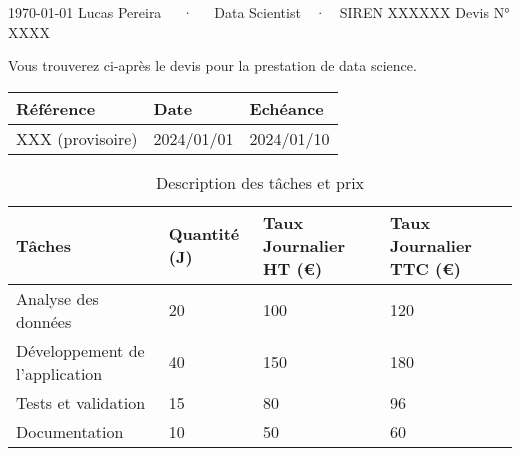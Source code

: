 \documentclass[11pt, a4paper]{awesome-cv}
\begin{document}
\makecvheader[R]

\makecvfooter
  {\today}
  {Lucas Pereira~~~·~~~Data Scientist~~·~~SIREN XXXXXX}
  {Devis N° XXXX}

\makelettertitle

\begin{cvletter}

Vous trouverez ci-après le devis pour la prestation de data science.

\vspace{1cm} %

\renewcommand{\arraystretch}{1.5}
\newcommand{\tablefont}{\fontsize{10pt}{13pt}\selectfont}

\begin{table}[h!]
    \centering
    \tablefont
    \color{tabletext}
    \begin{tabular}{C{5cm} C{5cm} C{5cm}}
        \rule{0pt}{2.5ex} \textbf{Référence} & \textbf{Date} & \textbf{Echéance} \\
        \hline
        \rule{0pt}{2.5ex} XXX (provisoire) & 2024/01/01 & 2024/01/10
    \end{tabular}
\end{table}

\begin{table}[h!]
    \centering
    \tablefont
    \caption{Description des tâches et prix}
    \medskip
    \color{tabletext} %
    \begin{tabular}{|p{6cm}|C{3cm}|C{4cm}|C{4cm}|}
        \hline
        \rule{0pt}{2.5ex} \textbf{Tâches} & \textbf{Quantité (J)} & \textbf{Taux Journalier HT (€)} & \textbf{Taux Journalier TTC (€)} \\
        \hline
        \rule{0pt}{2.5ex} Analyse des données & 20 & 100 & 120 \\
        \hline
        \rule{0pt}{2.5ex} Développement de l'application & 40 & 150 & 180 \\
        \hline
        \rule{0pt}{2.5ex} Tests et validation & 15 & 80 & 96 \\
        \hline
        \rule{0pt}{2.5ex} Documentation & 10 & 50 & 60 \\
        \hline
    \end{tabular}
\end{table}


\end{cvletter}
\end{document}

